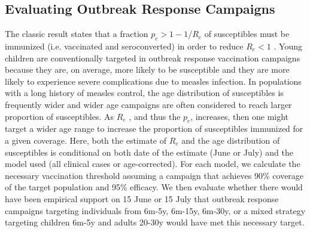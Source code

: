 \subsection{Evaluating Outbreak Response Campaigns}\label{ori}

The classic result states that a fraction \(p_c \gt 1-1/R_e\) of susceptibles must be immunized
(i.e. vaccinated and seroconverted) in order to reduce
\(R_e \lt 1\) \cite{Anderson_1981}. Young
children are conventionally targeted in outbreak response vaccination
campaigns because they are, on average, more likely to be susceptible
and they are more likely to experience severe complications due to
measles infection. In populations with a long history of measles
control, the age distribution of susceptibles is frequently wider \cite{23798689} and wider age campaigns are often
considered to reach larger proportion of susceptibles. As
\(R_e\) , and thus the \(p_c\),
increases, then one might target a wider age range to increase the
proportion of susceptibles immunized for a given coverage. Here, both
the estimate of \(R_e\) and the age distribution of
susceptibles is conditional on both date of the estimate (June or July)
and the model used (all clinical cases or age-corrected). For each
model, we calculate the necessary vaccination threshold assuming a
campaign that achieves 90\% coverage of the target population and 95\%
efficacy. We then evaluate whether there would have been empirical
support on 15 June or 15 July that outbreak response campaigns targeting
individuals from 6m-5y, 6m-15y, 6m-30y, or a mixed strategy targeting
children 6m-5y and adults 20-30y would have met this necessary target.